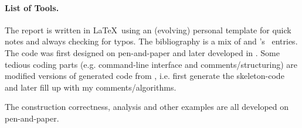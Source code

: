 \documentclass[a4paper,10pt]{article}
\begin{document}

	\vfill
	
	\paragraph{List of Tools.}
	The report is written in \LaTeX\ using an (evolving) personal template for quick notes and
	 always checking for typos.
	The bibliography is a mix of  and 's \BibTeX\ entries.
	The code was first designed on pen-and-paper and later developed in .
	Some tedious coding parts (e.g. command-line interface and comments/structuring) are
	modified versions of generated code from , i.e. first generate the skeleton-code
	and later fill up with my comments/algorithms.

	The construction correctness, analysis and other examples are all developed on pen-and-paper.

	\vspace{1mm}
	
	\vfill


	\clearpage
	
	
	\clearpage
	
	
	

	
	
\end{document}
